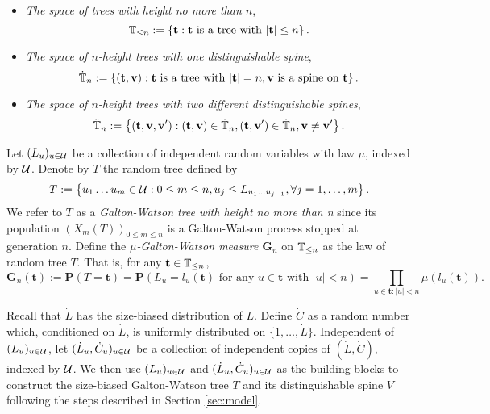 \documentclass[12pt]{amsart}
\numberwithin{equation}{section}
\newcommand{\defn}[1]{{\em #1}}
\newcommand{\prob}{\mathbf P}
\newcommand{\set}[1]{\left\{ #1 \right\}}
\newcommand{\tree}{\mathbf t}
\newcommand{\spine}{\mathbf v}
\newcommand{\bG}{\mathbf G}\newcommand{\bbG}{\mathbb G}\newcommand{\cG}{\mathcal G}
\begin{document}
\begin{itemize}
\item
	\defn{The space of trees with height no more than $n$},
\begin{equation*}
		\bbT_{\leq n}
	:=
				\set{\tree:\tree\text{ is a tree with }|\tree|\leq n}.
\end{equation*}
\item
	\defn {The space of $n$-height trees with one distinguishable spine},
\begin{equation*}
		\dot{\bbT}_n
	:=
				\set{(\tree,\spine):\tree \text{ is a tree with } |\tree|=n,
\spine \text{ is a spine on } \tree}.
\end{equation*}
	\item \defn{The space of $n$-height trees with two different distinguishable spines},
\begin{equation*}
		\ddot{\bbT}_n
	:=
		\set{(\tree,\spine,\spine'):(\tree,\spine)\in\dot\bbT_n,(\tree,\spine')\in\dot\bbT_n,\spine\neq\spine'}.
\end{equation*}
\end{itemize}
\par
	Let $(L_u)_{u\in\mathcal U}$ be a collection of independent random variables with law $\mu$, indexed by $\mathcal U$. Denote by $T$ the random tree defined by
\begin{equation*}
		T
	:=
		\set{u_1\dots u_m\in \cU: 0\le m\le n, u_j\leq L_{u_1\dots u_{j-1}},\forall j=1,\dots,m}.
\end{equation*}
	We refer to $T$ as a \defn{Galton-Watson tree with height no more than n} since its population
		$(X_m(T))_{0\le m\le n}$
	is a Galton-Watson process stopped at generation $n$.
	Define the \defn{$\mu$-Galton-Watson measure $\bG_n$} on $\mathbb T_{\leq n}$ as the law of random tree $T$. That is, for any $\tree\in\bbT_{\leq n}$,
\begin{equation*}
		\bG_n(\tree)
    :=
		\prob(T=\tree)
	=
        \prob(L_u=l_u(\tree)\text{ for any } u\in\tree \text{ with }|u|<n)
	=
		\prod_{u\in \tree:|u|<n}\mu(l_u(\tree)).
\end{equation*}
\par
	Recall that $\dot L$ has the size-biased distribution of $L$.
	Define $\dot C$ as a random number which, conditioned on $\dot L$, is uniformly distributed on
	$\{1,\dots,\dot L\}$.
	Independent of $(L_u)_{u\in\mathcal U}$, let $(\dot L_u,\dot C_u)_{u\in \mathcal U}$ be a collection of independent copies of $(\dot L,\dot C)$, indexed by $\mathcal U$.
	We then use $(L_u)_{u\in\mathcal U}$ and $(\dot L_u,\dot C_u)_{u\in\mathcal U}$ as the building blocks to construct the size-biased Galton-Watson tree $\dot T$ and its distinguishable spine $\dot V$ following the steps described in Section \ref{sec:model}.
\end{document}
